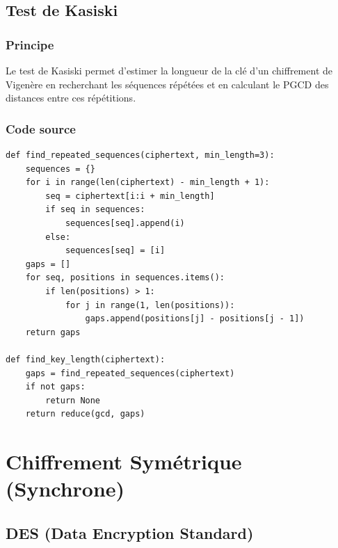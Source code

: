 \documentclass[12pt,a4paper]{report}
\begin{document}
\section{Test de Kasiski}

\subsection{Principe}
Le test de Kasiski permet d'estimer la longueur de la clé d'un chiffrement de Vigenère en recherchant les séquences répétées et en calculant le PGCD des distances entre ces répétitions.

\subsection{Code source}
\begin{lstlisting}[style=python,caption=TestDeKasiski.py - Fonctions clés]
def find_repeated_sequences(ciphertext, min_length=3):
    sequences = {}
    for i in range(len(ciphertext) - min_length + 1):
        seq = ciphertext[i:i + min_length]
        if seq in sequences:
            sequences[seq].append(i)
        else:
            sequences[seq] = [i]
    gaps = []
    for seq, positions in sequences.items():
        if len(positions) > 1:
            for j in range(1, len(positions)):
                gaps.append(positions[j] - positions[j - 1])
    return gaps

def find_key_length(ciphertext):
    gaps = find_repeated_sequences(ciphertext)
    if not gaps:
        return None
    return reduce(gcd, gaps)
\end{lstlisting}





\chapter{Chiffrement Symétrique (Synchrone)}

\section{DES (Data Encryption Standard)}
\end{document}
